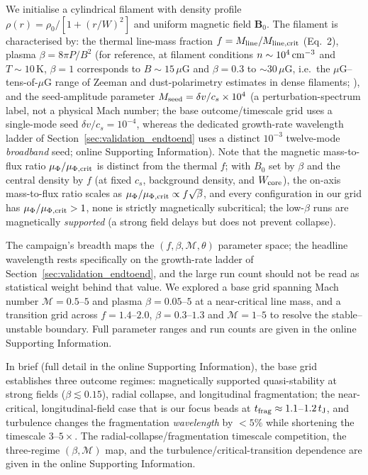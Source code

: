 \documentclass[usenatbib,twoside,twocolumn]{mnras}
\begin{document}
We initialise a cylindrical filament with density profile $\rho(r) = \rho_0 / [1 + (r/W)^2]$ and uniform magnetic field $\mathbf{B}_0$. The filament is characterised by: the thermal line-mass fraction $f = M_{\rm line}/M_{\rm line,crit}$ (Eq.~2), plasma $\beta = 8\pi P/B^2$ (for reference, at filament conditions $n\sim10^4\,{\rm cm^{-3}}$ and $T\sim10$\,K, $\beta=1$ corresponds to $B\sim15\,\mu$G and $\beta=0.3$ to $\sim30\,\mu$G, i.e.\ the $\mu$G--tens-of-$\mu$G range of Zeeman and dust-polarimetry estimates in dense filaments; \citealt{Crutcher2012}), and the seed-amplitude parameter $M_{\rm seed}=\delta v/c_s\times10^{4}$ (a perturbation-spectrum label, not a physical Mach number; the base outcome/timescale grid uses a single-mode seed $\delta v/c_s=10^{-4}$, whereas the dedicated growth-rate wavelength ladder of Section~\ref{sec:validation_endtoend} uses a distinct $10^{-3}$ twelve-mode \emph{broadband} seed; online Supporting Information). Note that the magnetic mass-to-flux ratio $\mu_\Phi/\mu_{\Phi,\rm crit}$ is distinct from the thermal $f$; with $B_0$ set by $\beta$ and the central density by $f$ (at fixed $c_s$, background density, and $W_{\rm core}$), the on-axis mass-to-flux ratio scales as $\mu_\Phi/\mu_{\Phi,\rm crit}\propto f\sqrt{\beta}$, and every configuration in our grid has $\mu_\Phi/\mu_{\Phi,\rm crit}>1$, none is strictly magnetically subcritical; the low-$\beta$ runs are magnetically \emph{supported} (a strong field delays but does not prevent collapse).

The campaign's breadth maps the $(f,\beta,\mathcal{M},\theta)$ parameter space; the headline wavelength rests specifically on the growth-rate ladder of Section~\ref{sec:validation_endtoend}, and the large run count should not be read as statistical weight behind that value. We explored a base grid spanning Mach number $\mathcal{M}=0.5$--$5$ and plasma $\beta=0.05$--$5$ at a near-critical line mass, and a transition grid across $f=1.4$--$2.0$, $\beta=0.3$--$1.3$ and $\mathcal{M}=1$--$5$ to resolve the stable--unstable boundary. Full parameter ranges and run counts are given in the online Supporting Information.

In brief (full detail in the online Supporting Information), the base grid establishes three outcome regimes: magnetically supported quasi-stability at strong fields ($\beta\lesssim0.15$), radial collapse, and longitudinal fragmentation; the near-critical, longitudinal-field case that is our focus beads at $t_{\rm frag}\approx1.1$--$1.2\,t_{\rm J}$, and turbulence changes the fragmentation \emph{wavelength} by $<5\%$ while shortening the timescale $3$--$5\times$. The radial-collapse/fragmentation timescale competition, the three-regime $(\beta,\mathcal{M})$ map, and the turbulence/critical-transition dependence are given in the online Supporting Information.
\end{document}
